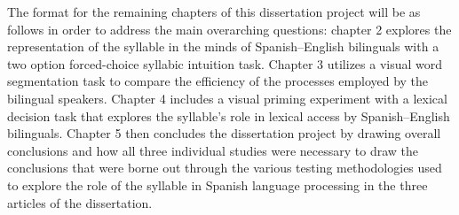 The format for the remaining chapters of this dissertation project will be as follows in order to address the main overarching questions: chapter 2 explores the representation of the syllable in the minds of Spanish–English bilinguals with a two option forced-choice syllabic intuition task. Chapter 3 utilizes a visual word segmentation task to compare the efficiency of the processes employed by the bilingual speakers. Chapter 4 includes a visual priming experiment with a lexical decision task that explores the syllable’s role in lexical access by Spanish–English bilinguals. Chapter 5 then concludes the dissertation project by drawing overall conclusions and how all three individual studies were necessary to draw the conclusions that were borne out through the various testing methodologies used to explore the role of the syllable in Spanish language processing in the three articles of the dissertation.















